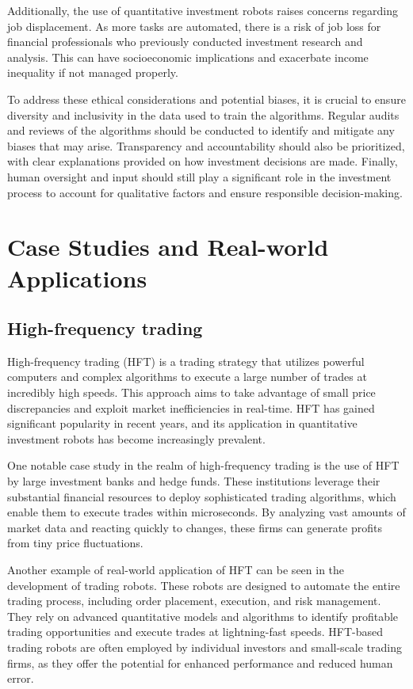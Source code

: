 \documentclass[UTF8]{ctexart}
\begin{document}
Additionally, the use of quantitative investment robots raises concerns regarding job displacement. As more tasks are automated, there is a risk of job loss for financial professionals who previously conducted investment research and analysis. This can have socioeconomic implications and exacerbate income inequality if not managed properly.

To address these ethical considerations and potential biases, it is crucial to ensure diversity and inclusivity in the data used to train the algorithms. Regular audits and reviews of the algorithms should be conducted to identify and mitigate any biases that may arise. Transparency and accountability should also be prioritized, with clear explanations provided on how investment decisions are made. Finally, human oversight and input should still play a significant role in the investment process to account for qualitative factors and ensure responsible decision-making.




\section{Case Studies and Real-world Applications}
\subsection{High-frequency trading}
High-frequency trading (HFT) is a trading strategy that utilizes powerful computers and complex algorithms to execute a large number of trades at incredibly high speeds. This approach aims to take advantage of small price discrepancies and exploit market inefficiencies in real-time. HFT has gained significant popularity in recent years, and its application in quantitative investment robots has become increasingly prevalent.

One notable case study in the realm of high-frequency trading is the use of HFT by large investment banks and hedge funds. These institutions leverage their substantial financial resources to deploy sophisticated trading algorithms, which enable them to execute trades within microseconds. By analyzing vast amounts of market data and reacting quickly to changes, these firms can generate profits from tiny price fluctuations.

Another example of real-world application of HFT can be seen in the development of trading robots. These robots are designed to automate the entire trading process, including order placement, execution, and risk management. They rely on advanced quantitative models and algorithms to identify profitable trading opportunities and execute trades at lightning-fast speeds. HFT-based trading robots are often employed by individual investors and small-scale trading firms, as they offer the potential for enhanced performance and reduced human error.
\end{document}
